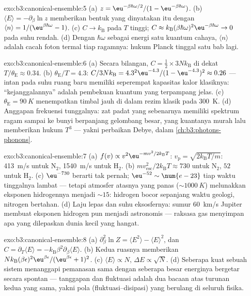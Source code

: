 \begin{solution}{exo:b3:canonical-ensemble:5}
(a) $z = \eu^{-\beta\hbar\omega/2}/(1 - \eu^{-\beta\hbar\omega})$.
(b) $\langle E\rangle = -\partial_\beta\ln z$ memberikan bentuk yang
dinyatakan itu dengan $\langle n\rangle = 1/(\eu^{\beta\hbar\omega} - 1)$. (c)
$C \to k_{\text{B}}$ pada $T$ tinggi; $C \approx k_{\text{B}}(\beta
\hbar\omega)^2\eu^{-\beta\hbar\omega} \to 0$ pada suhu rendah. (d) Dengan
$\hbar\omega$ sebagai energi satu kuantum cahaya, $\langle n\rangle$
adalah cacah foton termal tiap ragamnya: hukum Planck tinggal satu bab
lagi.
\end{solution}

\begin{solution}{exo:b3:canonical-ensemble:6}
(a) Secara bilangan, $C = \tfrac12 \times 3Nk_{\text{B}}$ di dekat
$T/\theta_{\text{E}} \approx 0.34$. (b) $\theta_{\text{E}}/T =
4.3$: $C/3Nk_{\text{B}} = 4.3^2\eu^{-4.3}/(1 - \eu^{-4.3})^2
\approx 0.26$ --- intan pada suhu ruang baru memiliki seperempat
kapasitas kalor klasiknya: ``kejanggalannya'' adalah pembekuan kuantum
yang terpampang jelas. (c) $\theta_{\text{E}} = \qty{90}{K}$
menempatkan timbal jauh di dalam rezim klasik pada \qty{300}{K}. (d)
Anggapan frekuensi tunggalnya: zat padat yang sebenarnya memiliki
spektrum ragam sampai ke bunyi berpanjang gelombang besar, yang
kuantanya murah lalu memberikan hukum $T^3$ --- yakni perbaikan Debye,
dalam \cref{ch:b3:photons-phonons}.
\end{solution}

\begin{solution}{exo:b3:canonical-ensemble:7}
(a) $f(v) \propto v^2\eu^{-mv^2/2k_{\text{B}}T}$: $v_{\text{p}} =
\sqrt{2k_{\text{B}}T/m}$: \qty{413}{m/s} untuk N$_2$,
\qty{1540}{m/s} untuk H$_2$. (b) $mv_{\text{esc}}^2/2k_{\text{B}}T
\approx 730$ untuk N$_2$, $52$ untuk H$_2$. (c) $\eu^{-730}$ berarti
tak pernah; $\eu^{-52} \sim \num{e-23}$ tiap waktu tinggalnya lambat ---
tetapi atmosfer atasnya yang panas ($\sim\qty{1000}{K}$) melunakkan
eksponen hidrogennya menjadi $\sim15$: hidrogen bocor sepanjang waktu
geologi, nitrogen bertahan. (d) Laju lepas dan suhu eksosfernya: sumur
\qty{60}{km/s} Jupiter membuat eksponen hidrogen pun menjadi
astronomis --- raksasa gas menyimpan apa yang dilepaskan dunia kecil
yang hangat.
\end{solution}

\begin{solution}{exo:b3:canonical-ensemble:8}
(a) $\partial_\beta^2\ln Z = \langle E^2\rangle - \langle
E\rangle^2$, dan $C = \partial_T\langle E\rangle =
-k_{\text{B}}\beta^2\partial_\beta\langle E\rangle$. (b) Kedua
ruasnya memberikan $Nk_{\text{B}}(\beta\epsilon)^2\eu^{\beta\epsilon}/(
\eu^{\beta\epsilon} + 1)^2$. (c) $\langle E\rangle \propto N$,
$\Delta E \propto \sqrt N$. (d) Seberapa kuat sebuah sistem menanggapi
pemanasan sama dengan seberapa besar energinya bergetar secara spontan
--- tanggapan dan fluktuasi adalah dua bacaan atas turunan kedua yang
sama, yakni pola (fluktuasi--disipasi) yang berulang di seluruh fisika.
\end{solution}

